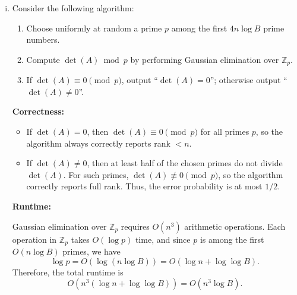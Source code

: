\documentclass[11pt]{article}
\begin{document}
\begin{enumerate}[1)]
\begin{solution}
\begin{enumerate}[i)]
For the first $4n \log B$ prime numbers, since at most $2n \log B$ of them divide $\det(A)$, at least half of them do not divide $\det(A)$.

\item 
Consider the following algorithm:
\begin{enumerate}[(1)]
\item Choose uniformly at random a prime $p$ among the first $4n \log B$ prime numbers.
\item Compute $\det(A) \bmod p$ by performing Gaussian elimination over $\mathbb{Z}_p$.
\item If $\det(A) \equiv 0 \pmod p$, output ``$\det(A)=0$''; otherwise output ``$\det(A)\neq 0$''.
\end{enumerate}

\textbf{Correctness:}
\begin{itemize}
\item If $\det(A)=0$, then $\det(A) \equiv 0 \pmod p$ for all primes $p$, so the algorithm always correctly reports rank $< n$.
\item If $\det(A)\neq 0$, then at least half of the chosen primes do not divide $\det(A)$. For such primes, $\det(A) \not\equiv 0 \pmod p$, so the algorithm correctly reports full rank. Thus, the error probability is at most $1/2$.
\end{itemize}

\textbf{Runtime:}

Gaussian elimination over $\mathbb{Z}_p$ requires $O(n^3)$ arithmetic operations. Each operation in $\mathbb{Z}_p$ takes $O(\log p)$ time, and since $p$ is among the first $O(n \log B)$ primes, we have 
\[
\log p = O(\log (n \log B)) = O(\log n + \log \log B).
\]
Therefore, the total runtime is
\[
O(n^3 (\log n + \log \log B)) = O(n^3 \log B).
\]

\end{enumerate}
\end{solution}


\end{enumerate}
\end{document}
